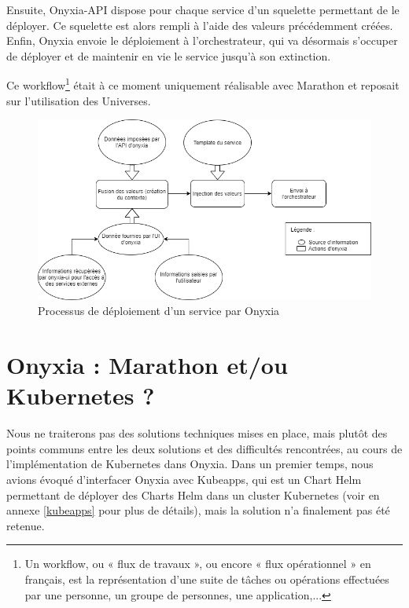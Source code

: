 \documentclass[11pt,fleqn]{book} %
\begin{document}
Ensuite, Onyxia-API dispose pour chaque service d'un squelette permettant de le déployer. Ce squelette est alors rempli à l'aide des valeurs précédemment créées.\\

Enfin, Onyxia envoie le déploiement à l'orchestrateur, qui va désormais s'occuper de déployer et de maintenir en vie le service jusqu'à son extinction.

Ce workflow\footnote{Un workflow, ou « flux de travaux », ou encore « flux opérationnel » en français, est la représentation d'une suite de tâches ou opérations effectuées par une personne, un groupe de personnes, une application,... } était à ce moment uniquement réalisable avec Marathon et reposait sur l'utilisation des Universes.\\




\begin{figure}[H]
\renewcommand{\figurename}{Diagramme}
\hspace{-1cm}
\includegraphics[scale=0.7]{Pictures/onyxia/onyxia-simplifie.png}
\captionsetup{margin=1.5cm,format=hang,justification=justified}
\caption[]{Processus de déploiement d'un service par Onyxia \newline}
\end{figure}



\section{Onyxia : Marathon et/ou Kubernetes ?}
Nous ne traiterons pas des solutions techniques mises en place, mais plutôt des points communs entre les deux solutions et des difficultés rencontrées, au cours de l'implémentation de Kubernetes dans Onyxia. Dans un premier temps, nous avions évoqué d'interfacer Onyxia avec Kubeapps, qui est un Chart Helm permettant de déployer des Charts Helm dans un cluster Kubernetes (voir en annexe \ref{kubeapps} pour plus de détails), mais la solution n'a finalement pas été retenue.\newline
\end{document}
